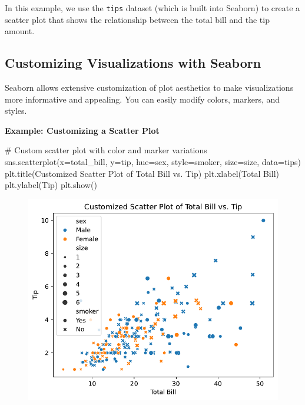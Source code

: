 \documentclass[
  letterpaper,
  DIV=11,
  numbers=noendperiod]{scrreprt}
\newenvironment{Shaded}{\begin{snugshade}}{\end{snugshade}}
\newcommand{\CommentTok}[1]{\textcolor[rgb]{0.37,0.37,0.37}{#1}}
\newcommand{\NormalTok}[1]{\textcolor[rgb]{0.00,0.23,0.31}{#1}}
\newcommand{\OperatorTok}[1]{\textcolor[rgb]{0.37,0.37,0.37}{#1}}
\newcommand{\StringTok}[1]{\textcolor[rgb]{0.13,0.47,0.30}{#1}}
\begin{document}
In this example, we use the \texttt{tips} dataset (which is built into
Seaborn) to create a scatter plot that shows the relationship between
the total bill and the tip amount.

\hypertarget{customizing-visualizations-with-seaborn}{%
\subsection{Customizing Visualizations with
Seaborn}\label{customizing-visualizations-with-seaborn}}

Seaborn allows extensive customization of plot aesthetics to make
visualizations more informative and appealing. You can easily modify
colors, markers, and styles.

\textbf{Example: Customizing a Scatter Plot}

\begin{Shaded}
\begin{Highlighting}[]
\CommentTok{\# Custom scatter plot with color and marker variations}
\NormalTok{sns.scatterplot(x}\OperatorTok{=}\StringTok{\textquotesingle{}total\_bill\textquotesingle{}}\NormalTok{, y}\OperatorTok{=}\StringTok{\textquotesingle{}tip\textquotesingle{}}\NormalTok{, hue}\OperatorTok{=}\StringTok{\textquotesingle{}sex\textquotesingle{}}\NormalTok{, style}\OperatorTok{=}\StringTok{\textquotesingle{}smoker\textquotesingle{}}\NormalTok{, size}\OperatorTok{=}\StringTok{\textquotesingle{}size\textquotesingle{}}\NormalTok{, data}\OperatorTok{=}\NormalTok{tips)}
\NormalTok{plt.title(}\StringTok{\textquotesingle{}Customized Scatter Plot of Total Bill vs. Tip\textquotesingle{}}\NormalTok{)}
\NormalTok{plt.xlabel(}\StringTok{\textquotesingle{}Total Bill\textquotesingle{}}\NormalTok{)}
\NormalTok{plt.ylabel(}\StringTok{\textquotesingle{}Tip\textquotesingle{}}\NormalTok{)}
\NormalTok{plt.show()}
\end{Highlighting}
\end{Shaded}

\begin{figure}[H]

{\centering \includegraphics{15_Data_Vis_files/figure-pdf/cell-11-output-1.pdf}

}

\end{figure}
\end{document}
